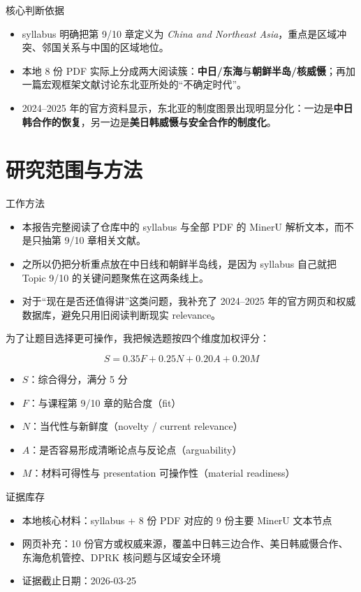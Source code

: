 \documentclass[a4paper]{article}
\begin{document}
\begin{evidencebox}{核心判断依据}
\begin{itemize}
\item syllabus 明确把第 9/10 章定义为 \textit{China and Northeast Asia}，重点是区域冲突、邻国关系与中国的区域地位。
\item 本地 8 份 PDF 实际上分成两大阅读簇：\textbf{中日/东海}与\textbf{朝鲜半岛/核威慑}；再加一篇宏观框架文献讨论东北亚所处的``不确定时代''。
\item 2024--2025 年的官方资料显示，东北亚的制度图景出现明显分化：一边是\textbf{中日韩合作的恢复}，另一边是\textbf{美日韩威慑与安全合作的制度化}。
\end{itemize}
\end{evidencebox}

\section{研究范围与方法}

\begin{methodbox}{工作方法}
\begin{itemize}
\item 本报告完整阅读了仓库中的 syllabus 与全部 PDF 的 MinerU 解析文本，而不是只抽第 9/10 章相关文献。
\item 之所以仍把分析重点放在中日线和朝鲜半岛线，是因为 syllabus 自己就把 Topic 9/10 的关键问题聚焦在这两条线上。
\item 对于``现在是否还值得讲''这类问题，我补充了 2024--2025 年的官方网页和权威数据库，避免只用旧阅读判断现实 relevance。
\end{itemize}
\end{methodbox}

为了让题目选择更可操作，我把候选题按四个维度加权评分：

$$
S = 0.35F + 0.25N + 0.20A + 0.20M
$$

\begin{itemize}
\item $S$：综合得分，满分 5 分
\item $F$：与课程第 9/10 章的贴合度（fit）
\item $N$：当代性与新鲜度（novelty / current relevance）
\item $A$：是否容易形成清晰论点与反论点（arguability）
\item $M$：材料可得性与 presentation 可操作性（material readiness）
\end{itemize}

\begin{evidencebox}{证据库存}
\begin{itemize}
\item 本地核心材料：syllabus + 8 份 PDF 对应的 9 份主要 MinerU 文本节点
\item 网页补充：10 份官方或权威来源，覆盖中日韩三边合作、美日韩威慑合作、东海危机管控、DPRK 核问题与区域安全环境
\item 证据截止日期：2026-03-25
\end{itemize}
\end{evidencebox}
\end{document}
